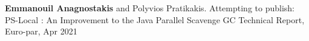 



\vspace{-15pt}
\begin{cventries}

  \cventry
    {}
    {}
    {}
    {}
    {\textbf{Emmanouil Anagnostakis} and Polyvios Pratikakis.
      Attempting to publish: PS-Local : An Improvement to the Java Parallel Scavenge GC
       Technical Report, Euro-par, Apr 2021 }{}%


\end{cventries}

